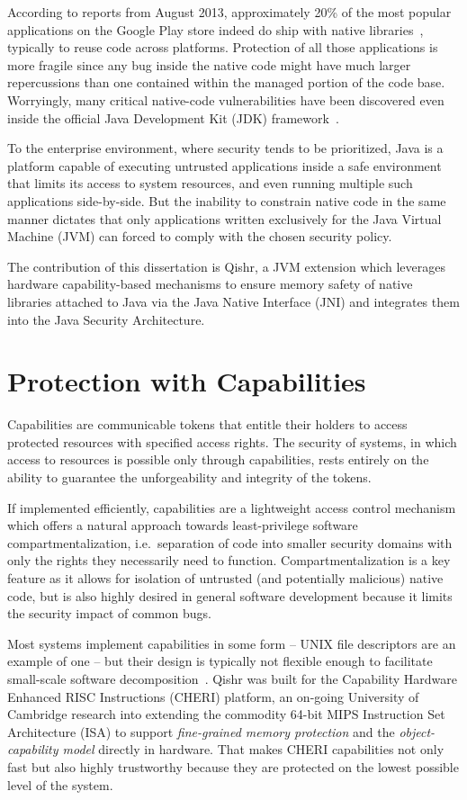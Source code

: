 \documentclass[a4paper,12pt,twoside,openright]{report}
\begin{document}
According to reports from August 2013, approximately 20\% of the most popular applications on the Google Play store indeed do ship with native libraries~\cite{poeplau2014execute}, typically to reuse code across platforms. Protection of all those applications is more fragile since any bug inside the native code might have much larger repercussions than one contained within the managed portion of the code base. Worryingly, many critical native-code vulnerabilities have been discovered even inside the official Java Development Kit (JDK) framework~\cite{Tan:2008:ESS:1496711.1496736}.

To the enterprise environment, where security tends to be prioritized, Java is a platform capable of executing untrusted applications inside a safe environment that limits its access to system resources, and even running multiple such applications side-by-side. But the inability to constrain native code in the same manner dictates that only applications written exclusively for the Java Virtual Machine (JVM) can forced to comply with the chosen security policy.
 
The contribution of this dissertation is Qishr, a JVM extension which leverages hardware capability-based mechanisms to ensure memory safety of native libraries attached to Java via the Java Native Interface (JNI) and integrates them into the Java Security Architecture.

\section{Protection with Capabilities}

Capabilities are communicable tokens that entitle their holders to access protected resources with specified access rights. The security of systems, in which access to resources is possible only through capabilities, rests entirely on the ability to guarantee the unforgeability and integrity of the tokens.
 
If implemented efficiently, capabilities are a lightweight access control mechanism which offers a natural approach towards least-privilege software compartmentalization, i.e.\ separation of code into smaller security domains with only the rights they necessarily need to function. Compartmentalization is a key feature as it allows for isolation of untrusted (and potentially malicious) native code, but is also highly desired in general software development because it limits the security impact of common bugs.

Most systems implement capabilities in some form -- UNIX file descriptors are an example of one -- but their design is typically not flexible enough to facilitate small-scale software decomposition~\cite{Watson:2010:CPC:1929820.1929824}. Qishr was built for the Capability Hardware Enhanced RISC Instructions (CHERI) platform, an on-going University of Cambridge research into extending the commodity 64-bit MIPS Instruction Set Architecture (ISA) to support \emph{fine-grained memory protection} and the \emph{object-capability model} directly in hardware. That makes CHERI capabilities not only fast but also highly trustworthy because they are protected on the lowest possible level of the system.
 
\end{document}
